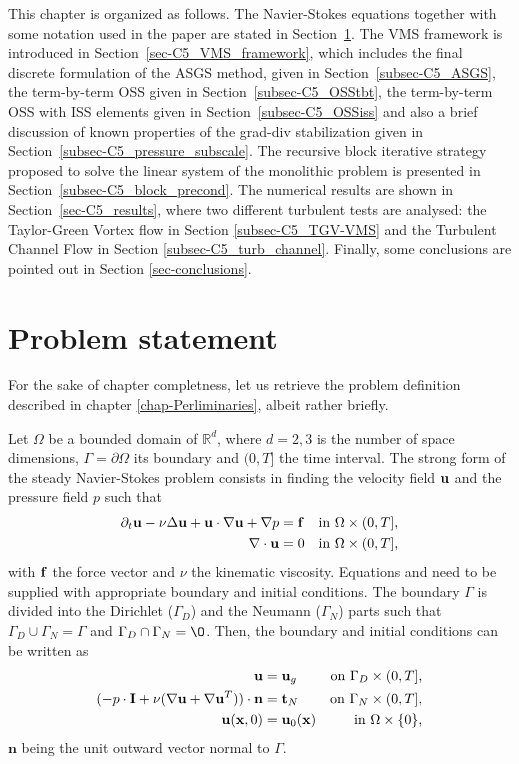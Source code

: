 This chapter is organized as follows. The Navier-Stokes equations together with some notation used in the paper are stated in Section~\ref{sec-C5_prob_statment}. The VMS framework is introduced in Section~\ref{sec-C5_VMS_framework}, which includes the final discrete formulation of the ASGS method, given in Section~\ref{subsec-C5_ASGS}, the term-by-term OSS given in Section~\ref{subsec-C5_OSStbt}, the term-by-term OSS with ISS elements given in Section~\ref{subsec-C5_OSSiss} and also a brief discussion of known properties of the grad-div stabilization given in Section~\ref{subsec-C5_pressure_subscale}. The recursive block iterative strategy proposed to solve the linear system of the monolithic problem is presented in Section~\ref{subsec-C5_block_precond}. The numerical results are shown in Section~\ref{sec-C5_results}, where two different turbulent tests are analysed: the Taylor-Green Vortex flow in Section \ref{subsec-C5_TGV-VMS} and the Turbulent Channel Flow in Section \ref{subsec-C5_turb_channel}. Finally, some conclusions are pointed out in Section \ref{sec-conclusions}.

\section{Problem statement}
\label{sec-C5_prob_statment}
For the sake of chapter completness, let us retrieve the problem definition described in chapter \ref{chap-Perliminaries}, albeit rather briefly.

Let $\Omega$ be a bounded domain of $\mathbb{R}^d$, where $d=2,3$ is the number of space dimensions, $\Gamma=\partial\Omega$ its boundary and $(0,T]$ the time interval. The strong form of the steady Navier-Stokes problem consists in finding the velocity field ${\bf u}$ and the pressure field $p$ such that 
\begin{align}
\label{eq-C5_NS_strong_mome}
\partial_t{\bf u}-\nu\Delta{\bf u}+{\bf u}\cdot\nabla{\bf u}+\nabla p&={\bf f}&\mbox{in $\Omega\times(0,T]$,}\\
\label{eq-C5_NS_strong_inc}
\nabla\cdot{\bf u}&=0&\mbox{in $\Omega\times(0,T]$,}
\end{align}
with ${\bf f}$ the force vector and $\nu$ the kinematic viscosity. Equations  and  need to be supplied with appropriate boundary and initial conditions. The boundary $\Gamma$ is divided into the Dirichlet ($\Gamma_D$) and the Neumann ($\Gamma_N$) parts such that $\Gamma_D\cup\Gamma_N=\Gamma$ and $\Gamma_D\cap\Gamma_N=\O$. Then, the boundary and initial conditions can be written as
\begin{align}
\label{eq-C5_NS_strong_Dir}
{\bf u}&={\bf u}_g&\mbox{on $\Gamma_D\times(0,T]$,}\\
\label{eq-C5_NS_strong_Neu}
(-p\cdot\mathbf{I}+\nu(\nabla{\bf u}+\nabla{\bf u}^T))\cdot\mathbf{n}&=\mathbf{t}_N&\mbox{on $\Gamma_N\times(0,T]$,}\\
\label{eq-C5_NS_strong_Ini}
{\bf u}({\bf x},0)&={\bf u}_0({\bf x})&\mbox{in $\Omega\times\{0\}$,}
\end{align}
$\mathbf{n}$ being the unit outward vector normal to $\Gamma$.


